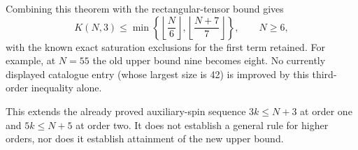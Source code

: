 \documentclass[11pt]{article}
\begin{document}
Combining this theorem with the rectangular-tensor bound gives
\[
 K(N,3)\le\min\left\{\left\lfloor\frac N6\right\rfloor,
                  \left\lfloor\frac{N+7}{7}\right\rfloor\right\},
 \qquad N\ge6,
\]
with the known exact saturation exclusions for the first term retained.
For example, at $N=55$ the old upper bound nine becomes eight.
No currently displayed catalogue entry (whose largest size is 42) is
improved by this third-order inequality alone.

This extends the already proved auxiliary-spin sequence
$3k\le N+3$ at order one and $5k\le N+5$ at order two.
It does not establish a general rule for higher orders, nor does it
establish attainment of the new upper bound.
\end{document}
